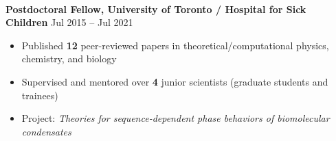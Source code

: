 \documentclass[11pt,letterpaper, sans]{article}
\begin{document}
\begin{flushleft}


\vspace{-1.5em}\ \

{\bf Postdoctoral Fellow, 
University of Toronto / Hospital for Sick Children} 
\hfill Jul 2015 -- Jul 2021  %
\vspace{-0.5em}\\
\begin{itemize}[leftmargin=*]\itemsep-0.1em
\item Published {\bf 12} peer-reviewed papers in theoretical/computational physics, chemistry, and biology
\item Supervised and mentored over {\bf 4} junior scientists (graduate students and trainees)
\item Project: {\it Theories for sequence-dependent phase behaviors of biomolecular condensates}
\end{itemize}


\end{flushleft}
\end{document}
